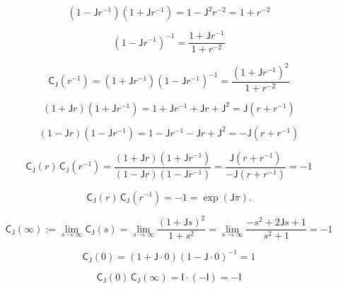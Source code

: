 \documentclass[12pt]{article}
\begin{document}
\begin{equation}
(1-\mathsf{J}r^{-1})(1+\mathsf{J}r^{-1})
=1-\mathsf{J}^2 r^{-2}
=1+r^{-2}
\end{equation}

\begin{equation}
(1-\mathsf{J}r^{-1})^{-1}=\frac{1+\mathsf{J}r^{-1}}{1+r^{-2}}
\end{equation}

\begin{equation}
\mathsf{C}_{\mathsf{J}}(r^{-1})
=(1+\mathsf{J}r^{-1})(1-\mathsf{J}r^{-1})^{-1}
=\frac{(1+\mathsf{J}r^{-1})^2}{1+r^{-2}}
\end{equation}

\begin{equation}
(1+\mathsf{J}r)(1+\mathsf{J}r^{-1})
=1+\mathsf{J}r^{-1}+\mathsf{J}r+\mathsf{J}^2
=\mathsf{J}(r+r^{-1})
\end{equation}

\begin{equation}
(1-\mathsf{J}r)(1-\mathsf{J}r^{-1})
=1-\mathsf{J}r^{-1}-\mathsf{J}r+\mathsf{J}^2
=-\mathsf{J}(r+r^{-1})
\end{equation}

\begin{equation}
\mathsf{C}_{\mathsf{J}}(r)\,\mathsf{C}_{\mathsf{J}}(r^{-1})
=\frac{(1+\mathsf{J}r)(1+\mathsf{J}r^{-1})}{(1-\mathsf{J}r)(1-\mathsf{J}r^{-1})}
=\frac{\mathsf{J}(r+r^{-1})}{-\mathsf{J}(r+r^{-1})}
=-1
\end{equation}

\begin{equation}
\boxed{
\mathsf{C}_{\mathsf{J}}(r)\,\mathsf{C}_{\mathsf{J}}(r^{-1})=-1
=\exp(\mathsf{J}\pi).
}
\end{equation}

\begin{equation}
\mathsf{C}_{\mathsf{J}}(\infty)
:=\lim_{s\to\infty}\mathsf{C}_{\mathsf{J}}(s)
=\lim_{s\to\infty}\frac{(1+\mathsf{J}s)^2}{1+s^2}
=\lim_{s\to\infty}\frac{-s^2+2\mathsf{J}s+1}{s^2+1}
=-1
\end{equation}

\begin{equation}
\mathsf{C}_{\mathsf{J}}(0)
=(1+\mathsf{J}\cdot 0)(1-\mathsf{J}\cdot 0)^{-1}
=1
\end{equation}

\begin{equation}
\mathsf{C}_{\mathsf{J}}(0)\,\mathsf{C}_{\mathsf{J}}(\infty)
=\mathsf{I}\cdot(-\mathsf{I})
=-\mathsf{I}
\end{equation}
\end{document}

